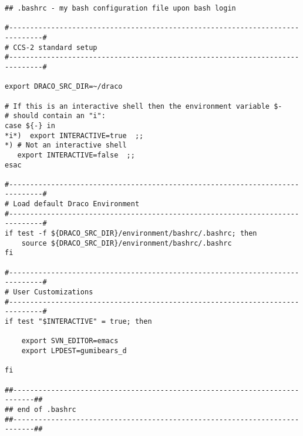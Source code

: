 \begin{verbatim}
## .bashrc - my bash configuration file upon bash login

#------------------------------------------------------------------------------#
# CCS-2 standard setup
#------------------------------------------------------------------------------#

export DRACO_SRC_DIR=~/draco

# If this is an interactive shell then the environment variable $-
# should contain an "i":
case ${-} in 
*i*)  export INTERACTIVE=true  ;;
*) # Not an interactive shell
   export INTERACTIVE=false  ;;
esac

#------------------------------------------------------------------------------#
# Load default Draco Environment
#------------------------------------------------------------------------------#
if test -f ${DRACO_SRC_DIR}/environment/bashrc/.bashrc; then
    source ${DRACO_SRC_DIR}/environment/bashrc/.bashrc
fi

#------------------------------------------------------------------------------#
# User Customizations
#------------------------------------------------------------------------------#
if test "$INTERACTIVE" = true; then

    export SVN_EDITOR=emacs
    export LPDEST=gumibears_d

fi

##---------------------------------------------------------------------------##
## end of .bashrc
##---------------------------------------------------------------------------##
\end{verbatim}
